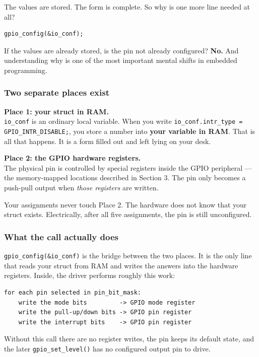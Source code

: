 \documentclass[11pt]{article}
\begin{document}
The values are stored. The form is complete. So why is one more line needed at all?

\begin{verbatim}
gpio_config(&io_conf);
\end{verbatim}

If the values are already stored, is the pin not already configured? \textbf{No.} And understanding why is one of the most important mental shifts in embedded programming.

\subsubsection*{Two separate places exist}

\textbf{Place 1: your struct in RAM.} \\
\texttt{io\_conf} is an ordinary local variable. When you write \texttt{io\_conf.intr\_type = GPIO\_INTR\_DISABLE;}, you store a number into \textbf{your variable in RAM}. That is all that happens. It is a form filled out and left lying on your desk.

\textbf{Place 2: the GPIO hardware registers.} \\
The physical pin is controlled by special registers inside the GPIO peripheral --- the memory-mapped locations described in Section 3. The pin only becomes a push-pull output when \emph{those registers} are written.

Your assignments never touch Place 2. The hardware does not know that your struct exists. Electrically, after all five assignments, the pin is still unconfigured.

\subsubsection*{What the call actually does}

\texttt{gpio\_config(\&io\_conf)} is the bridge between the two places. It is the only line that reads your struct from RAM and writes the answers into the hardware registers. Inside, the driver performs roughly this work:

\begin{verbatim}
for each pin selected in pin_bit_mask:
    write the mode bits         -> GPIO mode register
    write the pull-up/down bits -> GPIO pin register
    write the interrupt bits    -> GPIO pin register
\end{verbatim}

Without this call there are no register writes, the pin keeps its default state, and the later \texttt{gpio\_set\_level()} has no configured output pin to drive.
\end{document}
